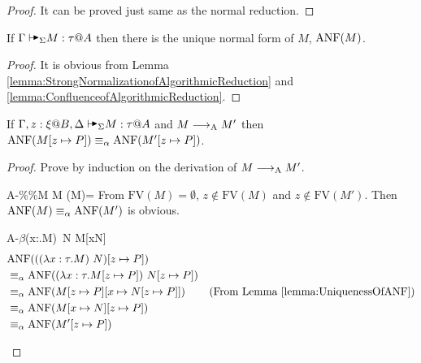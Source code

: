 \begin{proof}
    It can be proved just same as the normal reduction.
\end{proof}

\begin{lemma}
    \label{lemma:UniquenessOfANF}
    If \( \G \AVS M : \tau @ A \) then there is the unique normal form of \( M \), \( \text{ANF}(M) \).
\end{lemma}

\begin{proof}
    It is obvious from Lemma \ref{lemma:StrongNormalizationofAlgorithmicReduction} and \ref{lemma:ConfluenceofAlgorithmicReduction}.
\end{proof}

\begin{lemma}
    \label{lemma:AlgorithmicReductionAndTermSubstitution}
    If \( \G, z:\xi@B, \D \AVS M : \tau @ A \) and \( M \longrightarrow_{\text{A}} M' \) then
    \( \text{ANF}(M[z\mapsto P]) \equiv_\alpha \text{ANF}(M'[z\mapsto P]) \).
\end{lemma}

\begin{proof}
    Prove by induction on the derivation of \( M \longrightarrow_{\text{A}} M' \).
    \begin{rneqncase}{\textsc{A-\%}}{\%M \RA M  (M)=\emptyset}
        From \( \text{FV}(M)=\emptyset \), \( z \notin \text{FV}(M) \) and \( z \notin \text{FV}(M') \).
        Then \( \text{ANF}(M) \equiv_\alpha \text{ANF}(M') \) is obvious.
    \end{rneqncase}

    \begin{rneqncase}{\textsc{A-$\beta$}}{(\lambda x:\tau.M)\ N \RA M[x\mapsto N]}
        \begin{align*}
            & \text{ANF}(((\lambda x:\tau.M)\ N)[z \mapsto P]) \\
            & \equiv_\alpha \text{ANF}((\lambda x:\tau.M[z \mapsto P])\ N[z \mapsto P]) \\
            & \equiv_\alpha \text{ANF}(M[z \mapsto P][x \mapsto N[z \mapsto P]]) & (\text{From Lemma } \ref{lemma:UniquenessOfANF}) \\
            & \equiv_\alpha \text{ANF}(M[x \mapsto N][z \mapsto P]) \\
            & \equiv_\alpha \text{ANF}(M'[z \mapsto P])
        \end{align*}
    \end{rneqncase}
\end{proof}

